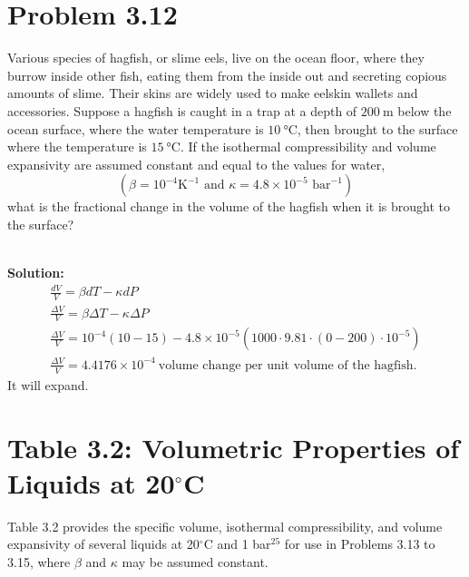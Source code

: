 \documentclass{article}
\newenvironment{solution}{\par\noindent\textbf{\\Solution:\\}}{\par\medskip}
\begin{document}
\section*{Problem 3.12}
Various species of hagfish, or slime eels, live on the ocean floor,
where they burrow inside other fish, eating them from the inside out
and secreting copious amounts of slime. Their skins are widely used
to make eelskin wallets and accessories. Suppose a hagfish is caught
in a trap at a depth of $200~\unit{ \meter }$ below the ocean
surface, where the water temperature is $10~\unit{ \degreeCelsius }$,
then brought to the surface where the temperature is $15~\unit{
\degreeCelsius }$. If the isothermal compressibility and volume
expansivity are assumed constant and equal to the values for water,
$$ (\beta = 10^{-4} \text{K}^{-1} \text{ and } \kappa = 4.8 \times
10^{-5} \text{ bar}^{-1}) $$
what is the fractional change in the volume of the hagfish when it is
brought to the surface?

\begin{solution}
  \begin{gather*}
    \frac{dV}{V}=\beta dT-\kappa dP\\
    \frac{\Delta V}{V}=\beta \Delta T-\kappa \Delta P\\
    \frac{\Delta V}{V}=10^{-4}\left( 10-15
    \right)-4.8\times10^{-5}\left( 1000\cdot9.81\cdot\left( 0-200
    \right)\cdot10^{-5} \right)\\
    \boxed{ \frac{\Delta V}{V}=4.4176\times10^{-4}~\text{volume
    change per unit volume of the hagfish.} }
  \end{gather*}
  It will expand.
\end{solution}

\section*{Table 3.2: Volumetric Properties of Liquids at 20$^\circ$C}
Table 3.2 provides the specific volume, isothermal compressibility,
and volume expansivity of several liquids at 20$^\circ$C and 1
bar$^{25}$ for use in Problems 3.13 to 3.15, where $\beta$ and
$\kappa$ may be assumed constant.
\end{document}
